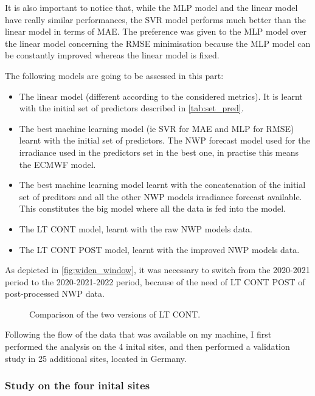 It is also important to notice that, while the MLP model and the linear model have really similar performances, the SVR model performs much better than the linear model in terms of MAE.
The preference was given to the MLP model over the linear model concerning the RMSE minimisation because the MLP model can be constantly improved whereas the linear model is fixed.

The following models are going to be assessed in this part:
\begin{itemize}
    \item The linear model (different according to the considered metrics). It is learnt with the initial set of predictors described in \autoref{tab:set_pred}.
    \item The best machine learning model (ie SVR for MAE and MLP for RMSE) learnt with the initial set of predictors. The NWP forecast model used for the irradiance used in the predictors set in the best one, in practise this means the ECMWF model.
    \item The best machine learning model learnt with the concatenation of the initial set of preditors and all the other NWP models irradiance forecast available. This constitutes the big model where all the data is fed into the model.
    \item The LT CONT model, learnt with the raw NWP models data.
    \item The LT CONT POST model, learnt with the improved NWP models data.
\end{itemize}

As depicted in \autoref{fig:widen_window}, it was necessary to switch from the 2020-2021 period to the 2020-2021-2022 period, because of the need of LT CONT POST of post-processed NWP data.
\begin{figure}[htb!]
    \centering
    
\caption{Comparison of the two versions of LT CONT.}
\label{fig:widen_window}
\end{figure}

Following the flow of the data that was available on my machine, I first performed the analysis on the 4 inital sites, and then performed a validation study in 25 additional sites, located in Germany.

\subsubsection{Study on the four inital sites}
\label{sec:initial_study}
